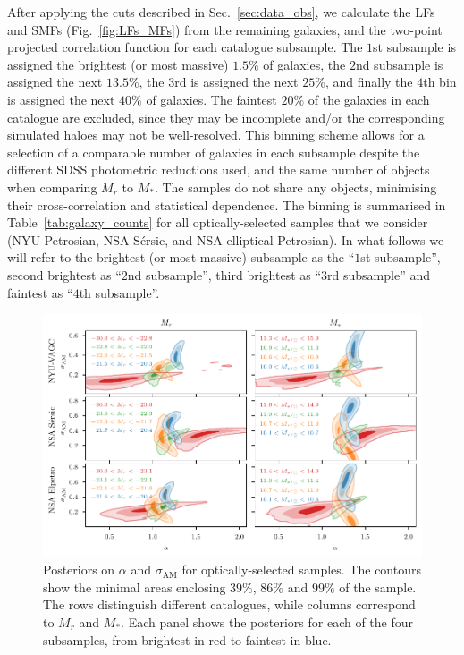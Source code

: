 \documentclass[usenatbib,useAMS]{mnras}
\newcommand{\scatter}{\ensuremath{\sigma_{\mathrm{AM}}}}
\begin{document}
After applying the cuts described in Sec.~\ref{sec:data_obs}, we calculate the \acp{LF} and \acp{SMF} (Fig.~\ref{fig:LFs_MFs}) from the remaining galaxies, and the two-point projected correlation function for each catalogue subsample. The $1$st subsample is assigned the brightest (or most massive) $1.5\%$ of galaxies, the $2$nd subsample is assigned the next $13.5\%$, the $3$rd is assigned the next $25\%$, and finally the $4$th bin is assigned the next $40\%$ of galaxies. The faintest $20\%$ of the galaxies in each catalogue are excluded, since they may be incomplete and/or the corresponding simulated haloes may not be well-resolved. This binning scheme allows for a selection of a comparable number of galaxies in each subsample despite the different \ac{SDSS} photometric reductions used, and the same number of objects when comparing $M_r$ to $M_*$. The samples do not share any objects, minimising their cross-correlation and statistical dependence. The binning is summarised in Table~\ref{tab:galaxy_counts} for all optically-selected samples that we consider (\ac{NYU} Petrosian, \ac{NSA} S\'ersic, and \ac{NSA} elliptical Petrosian). In what follows we will refer to the brightest (or most massive) subsample as the ``$1$st subsample'', second brightest as ``$2$nd subsample'', third brightest as ``$3$rd subsample'' and faintest as ``$4$th subsample''.

\begin{figure}
    \centering
    \includegraphics[width=\textwidth]{Figures/posteriors.pdf}
    \caption{Posteriors on $\alpha$ and $\scatter$ for optically-selected samples. The contours show the minimal areas enclosing $39\%$, $86\%$ and $99\%$ of the sample. The rows distinguish different catalogues, while columns correspond to $M_r$ and $M_*$. Each panel shows the posteriors for each of the four subsamples, from brightest in red to faintest in blue.}
    \label{fig:posterior_contours}
\end{figure}
\end{document}
